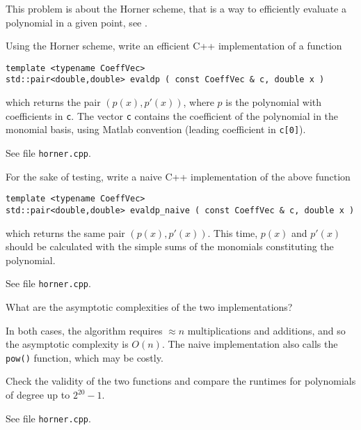 
\begin{problem}
\label{prb:EvaluatingDerivatives}
This problem is about the Horner scheme, that is a way to efficiently evaluate a polynomial in a given point, see .
\begin{subproblem}[3]
Using the Horner scheme, write an efficient C++ implementation of a function
\begin{lstlisting}
template <typename CoeffVec>
std::pair<double,double> evaldp ( const CoeffVec & c, double x )
\end{lstlisting}
which returns the pair $(p(x),p'(x))$, where $p$ is the polynomial with coefficients in \texttt{c}. The vector \texttt{c} contains the coefficient of the polynomial in the monomial basis, using Matlab convention (leading coefficient in \texttt{c[0]}).
\begin{solution}
See file \texttt{horner.cpp}.
\end{solution}
\end{subproblem}
\begin{subproblem}[2]
  For the sake of testing, write a naive C++ implementation of the above function
\begin{lstlisting}
template <typename CoeffVec>
std::pair<double,double> evaldp_naive ( const CoeffVec & c, double x )
\end{lstlisting}
which returns the same pair $(p(x),p'(x))$. This time, $p(x)$ and $p'(x)$ should be calculated with the simple sums of the monomials constituting the polynomial.
\begin{solution}
See file \texttt{horner.cpp}.
\end{solution}
\end{subproblem}
\begin{subproblem}[1]
What are the asymptotic complexities of the two implementations?
\begin{solution}
  In both cases, the algorithm requires $\approx n$ multiplications and additions,
  and so the asymptotic complexity is $O(n)$. The naive implementation also calls
  the \texttt{pow()} function, which may be costly. 
\end{solution}
\end{subproblem}
\begin{subproblem}[1]
Check the validity of the two functions and compare the runtimes for polynomials of degree up to $2^{20}-1$.
\begin{solution}
See file \texttt{horner.cpp}.
\end{solution}
\end{subproblem}
\end{problem}
